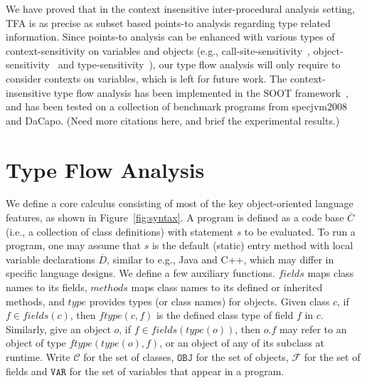 \documentclass{llncs}
\newcommand{\keyword}[1]{\mathsf{#1}}
\newcommand{\kwnull}[0]{\keyword{null}}
\newcommand\Var{\mathtt{VAR}}
\newcommand\Val{\mathtt{V}}
\newcommand\Obj{\mathtt{OBJ}}
\newcommand{\Class}{\mathcal{C}}
\newcommand{\Field}{\mathcal{F}}
\newcommand\set[1]{\{#1\}}
\begin{document}
We have proved that in the context insensitive inter-procedural analysis setting, TFA is as precise as subset based points-to analysis regarding type related information. Since points-to analysis can be enhanced with various types of context-sensitivity on variables and objects (e.g., call-site-sensitivity~\cite{Shivers91,Kastrinis2013}, object-sensitivity~\cite{Milanova2005,Smaragdakis11,Tan16} and type-sensitivity~\cite{Smaragdakis11}), our type flow analysis will only require to consider contexts on variables, which is left for future work. The context-insensitive type flow analysis has been implemented in the SOOT framework~\cite{soot}, and has been tested on a collection of benchmark programs from specjvm2008 and DaCapo. (Need more citations here, and brief the experimental results.)

\section{Type Flow Analysis}\label{sec:type-flow-analysis}

We define a core calculus consisting of most of the key object-oriented language features, as shown in Figure~\ref{fig:syntax}.
A program is defined as a code base $\overline{C}$ (i.e., a collection of class definitions) with statement $s$ to be evaluated.
To run a program, one may assume that $s$ is the default (static) entry method with local variable declarations $\overline{D}$,
similar to e.g., Java and C++,
which may differ in specific language designs.
We define a few auxiliary functions. $fields$ maps class names to its fields, $methods$ maps class names to its defined or inherited methods, and $type$ provides types (or class names) for objects. Given class $c$, if $f\in fields(c)$, then $ftype(c,f)$ is the defined class type of field $f$ in $c$. Similarly, give an object $o$, if $f\in fields(type(o))$, then $o.f$ may refer to an object of type $ftype(type(o),f)$,
or an object of any of its subclass at runtime. Write $\Class$ for the set of classes, $\Obj$ for the set of objects, $\Field$ for the set of fields and $\Var$ for the set of variables that appear in a program.

\end{document}
